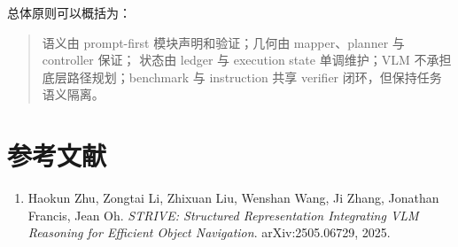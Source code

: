 \documentclass[UTF8,zihao=-4]{ctexart}
\begin{document}
总体原则可以概括为：

\begin{quote}
语义由 prompt-first 模块声明和验证；几何由 mapper、planner 与 controller 保证；
状态由 ledger 与 execution state 单调维护；VLM 不承担底层路径规划；benchmark
与 instruction 共享 verifier 闭环，但保持任务语义隔离。
\end{quote}

\section{参考文献}

\begin{enumerate}[leftmargin=1.5em]
  \item Haokun Zhu, Zongtai Li, Zhixuan Liu, Wenshan Wang, Ji Zhang,
  Jonathan Francis, Jean Oh. \textit{STRIVE: Structured Representation
  Integrating VLM Reasoning for Efficient Object Navigation}. arXiv:2505.06729,
  2025.
\end{enumerate}
\end{document}
